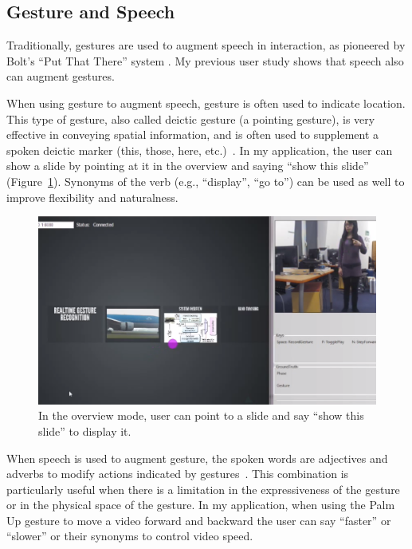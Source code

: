 \subsection{Gesture and Speech}
Traditionally, gestures are used to augment speech in interaction, as pioneered
by Bolt's ``Put That There'' system \cite{Bolt80}. My previous user study
\cite{yin10thesis} shows that speech also can augment gestures.

When using gesture to augment speech, gesture is often used to indicate
location. This type of gesture, also called deictic gesture (a pointing
gesture), is very effective in conveying spatial information, and is often used to
supplement a spoken deictic marker (this, those, here, etc.)~\cite{oviatt97,
tse07}.
In my application, the user can show a slide by pointing at it in the overview and
saying ``show this slide'' (Figure~\ref{fig:point-overview}). Synonyms of the
verb (e.g., ``display'', ``go to'') can be used as well to improve flexibility
and naturalness.

\begin{figure}[tbh]
\centering
\includegraphics[width=\columnwidth]{figures/point_overview.PNG}
\caption{In the overview mode, user can point to a slide and say ``show this
slide'' to display it.}
\label{fig:point-overview}
\end{figure}

When speech is used to augment gesture, the spoken words are adjectives and
adverbs to modify actions indicated by gestures~\cite{yin10thesis}. This
combination is particularly useful when there is a limitation in the
expressiveness of the gesture or in the physical space of the gesture. In my
application, when using the Palm Up gesture to move a video forward and
backward the user can say ``faster'' or ``slower'' or their synonyms to
control video speed.

